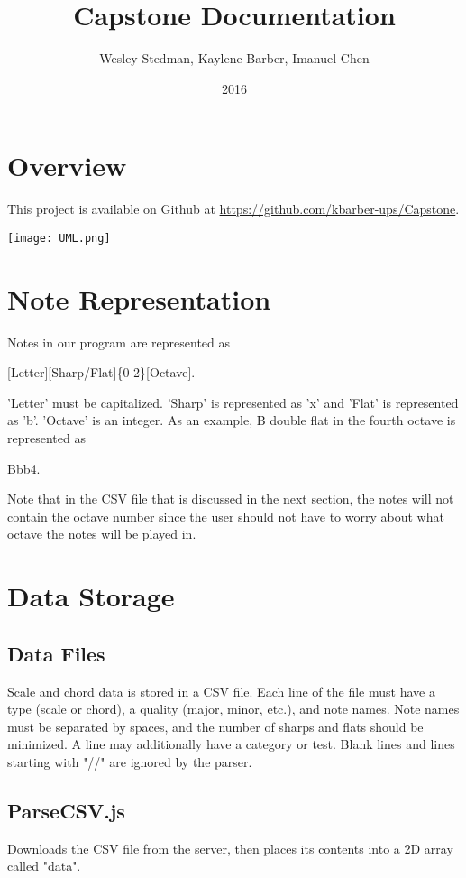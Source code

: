 \documentclass{article}
\title{Capstone Documentation}
\author{Wesley Stedman, Kaylene Barber, Imanuel Chen}
\date{2016}
\begin{document}
\maketitle

\tableofcontents

\pagebreak

\section{Overview}
This project is available on Github at \url{https://github.com/kbarber-ups/Capstone}.

\begin{center}
\texttt{[image: UML.png]}
\end{center}

\section{Note Representation}\label{sec:noteformat}
Notes in our program are represented as
\begin{center}
[Letter][Sharp/Flat]\{0-2\}[Octave].
\end{center}
'Letter' must be capitalized. 'Sharp' is represented as 'x' and 'Flat' is represented as 'b'. 'Octave' is an integer. As an example, B double flat in the fourth octave is represented as
\begin{center}
Bbb4.
\end{center}
Note that in the CSV file that is discussed in the next section, the notes will not contain the octave number since the user should not have to worry about what octave the notes will be played in.

\section{Data Storage}

\subsection{Data Files}
Scale and chord data is stored in a CSV file.  Each line of the file must have a type (scale or chord), a quality (major, minor, etc.), and note names. Note names must be separated by spaces, and the number of sharps and flats should be minimized.  A line may additionally have a category or test.  Blank lines and lines starting with "//" are ignored by the parser.

\subsection{ParseCSV.js}
Downloads the CSV file from the server, then places its contents into a 2D array called "data".
\end{document}
